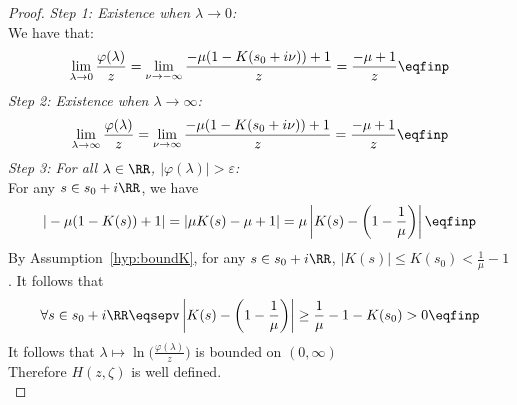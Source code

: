 \begin{proof}
\textit{Step 1: Existence when $\lambda \to 0$:}\\
We have that: 
\begin{align*}
    \lim_{\lambda \to 0}\frac{\varphi(\lambda)}{z} = \lim_{\nu\to-\infty}\frac{-\mu(1-K(s_0+i\nu))+1}{z} = \frac{-\mu+1}{z}
    \eqfinp
\end{align*}
\textit{Step 2: Existence when $\lambda \to \infty$:}
\begin{align*}
    \lim_{\lambda \to \infty}\frac{\varphi(\lambda)}{z} = \lim_{\nu\to\infty}\frac{-\mu(1-K(s_0+i\nu))+1}{z} = \frac{-\mu+1}{z}
    \eqfinp
\end{align*}
\textit{Step 3: For all $\lambda \in \RR$, $|\varphi(\lambda)| > \varepsilon$: }\\
For any $s \in s_0 + i\RR$, we have
    \begin{align*}
        |-\mu(1-K(s))+1| = |\mu K(s) - \mu + 1| = \mu \left|K(s) - \left(1-\frac{1}{\mu}\right)\right|
        \eqfinp
    \end{align*}
By Assumption~\ref{hyp:boundK}, for any $s \in s_0 + i\RR$, $|K(s)| \leq K(s_0) < \frac{1}{\mu} - 1$. It follows that
\begin{align*}
    \forall s \in s_0 + i\RR
    \eqsepv
    \left|K(s) - \left(1-\frac{1}{\mu}\right)\right| \geq \frac{1}\mu - 1 - K(s_0) > 0
    \eqfinp
\end{align*}
It follows that $\lambda \mapsto \ln\Big(\frac{\varphi(\lambda)}{z}\Big)$ is bounded on $(0, \infty)$\\

Therefore
$H(z,\zeta)$ is well defined.\\


\end{proof}
